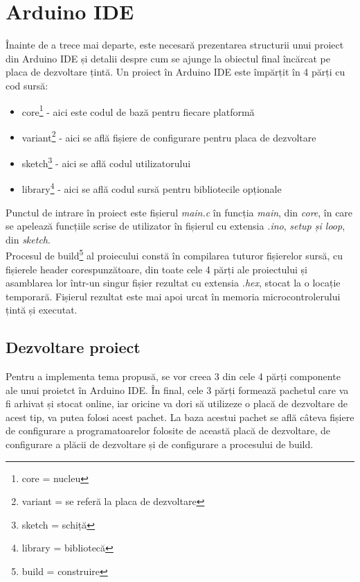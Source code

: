 \documentclass[12pt,a4paper]{report}
\begin{document}
\section{Arduino IDE}
Înainte de a trece mai departe, este necesară prezentarea structurii unui proiect din Arduino IDE și detalii despre cum se ajunge la obiectul final încărcat pe placa de dezvoltare țintă.
Un proiect în Arduino IDE este împărțit în 4 părți cu cod sursă:
\begin{itemize}
	\item{core\footnote{core = nucleu} - aici este codul de bază pentru fiecare platformă}
	\item{variant\footnote{variant = se referă la placa de dezvoltare} - aici se află fișiere de configurare pentru placa de dezvoltare}
	\item{sketch\footnote{sketch = schiță} - aici se află codul utilizatorului}
	\item{library\footnote{library = bibliotecă} - aici se află codul sursă pentru bibliotecile opționale}
\end{itemize}
Punctul de intrare în proiect este fișierul \textit{main.c} în funcția \textit{main}, din \textit{core}, în care se apelează funcțiile scrise de utilizator în fișierul cu extensia \textit{.ino}, \textit{setup și loop}, din \textit{sketch}. \\
Procesul de build\footnote{build = construire} al proiecului constă în compilarea tuturor fișierelor sursă, cu fișierele header corespunzătoare, din toate cele 4 părți ale proiectului și asamblarea lor într-un singur fișier rezultat cu extensia \textit{.hex}, stocat la o locație temporară. Fișierul rezultat este mai apoi urcat în memoria microcontrolerului țintă și executat.

\subsection{Dezvoltare proiect}
Pentru a implementa tema propusă, se vor creea 3 din cele 4 părți componente ale unui proietct în Arduino IDE. În final, cele 3 părți formează pachetul care va fi arhivat și stocat online, iar oricine va dori să utilizeze o placă de dezvoltare de acest tip, va putea folosi acest pachet. La baza acestui pachet se află câteva fișiere de configurare a programatoarelor folosite de această placă de dezvoltare, de configurare a plăcii de dezvoltare și de configurare a procesului de build.
\end{document}

